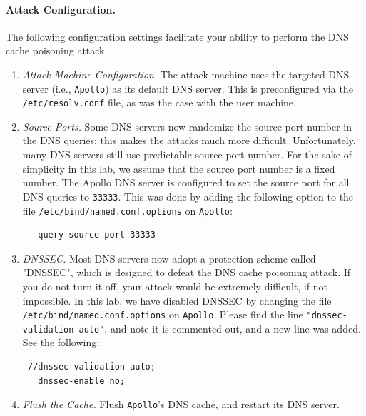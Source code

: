 \paragraph{Attack Configuration.} The following configuration settings
facilitate your ability to perform the DNS cache poisoning attack. 

\begin{enumerate}

\item {\em Attack Machine Configuration.} 
The attack machine uses the targeted 
DNS server (i.e., {\tt Apollo}) as its default DNS server. 
This is preconfigured via the {\tt /etc/resolv.conf} file, as was the case
with the user machine.

\item {\em Source Ports.} Some DNS servers now randomize the source port number 
in the DNS queries; this makes the attacks much more difficult. Unfortunately, 
many DNS servers still use predictable source port number.  
For the sake of simplicity in this lab, we assume that the source port 
number is a fixed number. The Apollo DNS server is configured to set
the source port for all DNS queries 
to {\tt 33333}. This was done by adding the following option to the file {\tt /etc/bind/named.conf.options}
on {\tt Apollo}:
\begin{verbatim}
   query-source port 33333
\end{verbatim}

\item {\em DNSSEC.}
Most DNS servers now adopt a protection scheme called "DNSSEC", which is
designed to defeat the DNS cache poisoning attack.  If you do not turn
it off, your attack would be extremely difficult, if not impossible.
In this lab, we have disabled DNSSEC by changing 
the file {\tt /etc/bind/named.conf.options} on {\tt Apollo}. Please find the line 
{\tt "dnssec-validation auto"}, and note it is commented out, and a new line was added. See
the following:
\begin{verbatim}
 //dnssec-validation auto;
   dnssec-enable no;
\end{verbatim}


\item {\em Flush the Cache.}
Flush {\tt Apollo}'s  DNS cache, and restart its DNS server. 


\end{enumerate}


